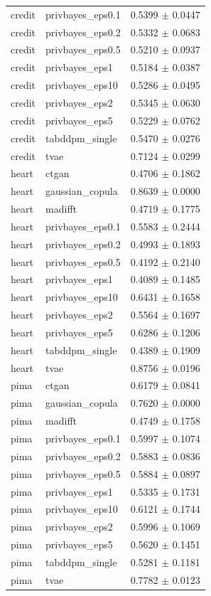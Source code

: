 \begin{tabular}{llc}
credit & privbayes_eps0.1 & 0.5399 $\pm$ 0.0447 \\
credit & privbayes_eps0.2 & 0.5332 $\pm$ 0.0683 \\
credit & privbayes_eps0.5 & 0.5210 $\pm$ 0.0937 \\
credit & privbayes_eps1 & 0.5184 $\pm$ 0.0387 \\
credit & privbayes_eps10 & 0.5286 $\pm$ 0.0495 \\
credit & privbayes_eps2 & 0.5345 $\pm$ 0.0630 \\
credit & privbayes_eps5 & 0.5229 $\pm$ 0.0762 \\
credit & tabddpm_single & 0.5470 $\pm$ 0.0276 \\
credit & tvae & 0.7124 $\pm$ 0.0299 \\
heart & ctgan & 0.4706 $\pm$ 0.1862 \\
heart & gaussian_copula & 0.8639 $\pm$ 0.0000 \\
heart & madifft & 0.4719 $\pm$ 0.1775 \\
heart & privbayes_eps0.1 & 0.5583 $\pm$ 0.2444 \\
heart & privbayes_eps0.2 & 0.4993 $\pm$ 0.1893 \\
heart & privbayes_eps0.5 & 0.4192 $\pm$ 0.2140 \\
heart & privbayes_eps1 & 0.4089 $\pm$ 0.1485 \\
heart & privbayes_eps10 & 0.6431 $\pm$ 0.1658 \\
heart & privbayes_eps2 & 0.5564 $\pm$ 0.1697 \\
heart & privbayes_eps5 & 0.6286 $\pm$ 0.1206 \\
heart & tabddpm_single & 0.4389 $\pm$ 0.1909 \\
heart & tvae & 0.8756 $\pm$ 0.0196 \\
pima & ctgan & 0.6179 $\pm$ 0.0841 \\
pima & gaussian_copula & 0.7620 $\pm$ 0.0000 \\
pima & madifft & 0.4749 $\pm$ 0.1758 \\
pima & privbayes_eps0.1 & 0.5997 $\pm$ 0.1074 \\
pima & privbayes_eps0.2 & 0.5883 $\pm$ 0.0836 \\
pima & privbayes_eps0.5 & 0.5884 $\pm$ 0.0897 \\
pima & privbayes_eps1 & 0.5335 $\pm$ 0.1731 \\
pima & privbayes_eps10 & 0.6121 $\pm$ 0.1744 \\
pima & privbayes_eps2 & 0.5996 $\pm$ 0.1069 \\
pima & privbayes_eps5 & 0.5620 $\pm$ 0.1451 \\
pima & tabddpm_single & 0.5281 $\pm$ 0.1181 \\
pima & tvae & 0.7782 $\pm$ 0.0123 \\
\bottomrule
\end{tabular}